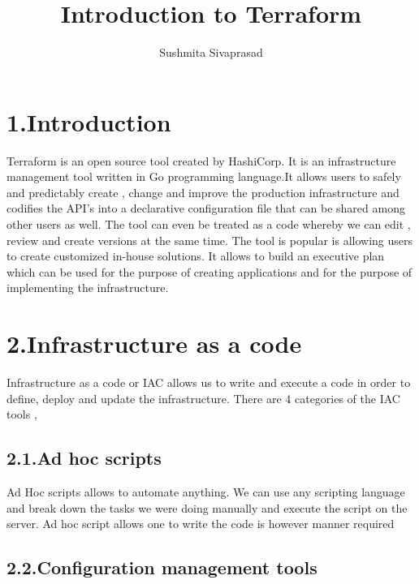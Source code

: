 \documentclass[9pt,twocolumn,twoside]{../../styles/osajnl}
\title{Introduction to Terraform}
\author[1]{Sushmita Sivaprasad}
\affil[1]{School of Informatics and Computing, Bloomington, IN 47408, U.S.A.}
\affil[*]{Corresponding authors: sushsiva@umail.iu.edu}
\begin{document}
\maketitle




\section{1.Introduction}

Terraform is an open source tool created by HashiCorp. It is an
infrastructure management tool written in Go programming language.It
allows users to safely and predictably create , change and improve the
production infrastructure and codifies the API's into a declarative
configuration file that can be shared among other users as
well\cite{www-terraform}. The tool can even be treated as a code
whereby we can edit , review and create versions at the same time. The
tool is popular is allowing users to create customized in-house
solutions. It allows to build an executive plan which can be used for
the purpose of creating applications and for the purpose of
implementing the infrastructure\cite{www-terraform-book}.

\section{2.Infrastructure as a code}

Infrastructure as a code or IAC allows us to write and execute a code
in order to define, deploy and update the infrastructure. There are 4
categories of the IAC tools ,
\subsection{2.1.Ad hoc scripts}

Ad Hoc scripts allows to automate anything. We can use any scripting
language and break down the tasks we were doing manually and execute
the script on the server. Ad hoc script allows one to write the code
is however manner required\cite{www-terraform-upandrunning}

\subsection{2.2.Configuration management tools}
\end{document}
